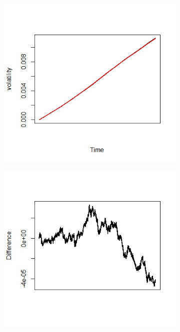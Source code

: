 \documentclass{article}
\begin{document}
\begin{figure}[h]
    \centering
    \begin{subfigure}{0.32\textwidth}
        \centering
        \includegraphics[width=\textwidth]{ex6_scale1.jpeg}
    \end{subfigure}\hfill
    \begin{subfigure}{0.32\textwidth}
        \centering
        \includegraphics[width=\textwidth]{ex6_scale2.jpeg}

\end{subfigure}
\end{figure}
\end{document}
